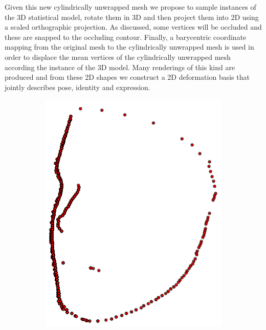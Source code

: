 Given this new cylindrically unwrapped mesh we propose to sample
instances of the 3D statistical model, rotate them in 3D and then project them
into 2D using a scaled orthographic projection. As discussed, some vertices
will be occluded and these are snapped to the occluding contour. Finally, a
barycentric coordinate mapping from the original mesh to the cylindrically
unwrapped mesh is used in order to displace the mean vertices of the cylindrically
unwrapped mesh according the instance of the 3D model. Many renderings of this
kind are produced and from these 2D shapes we construct a 2D deformation basis
that jointly describes pose, identity and expression.
\begin{figure}[t]
    \centering
    \hspace*{\fill}
    \begin{subfigure}[b]{0.23\textwidth}
        \centering
        \includegraphics[width=\textwidth]{face_flow/images/contour_snapping/posed_snapped_contour}

\end{subfigure}
\end{figure}
